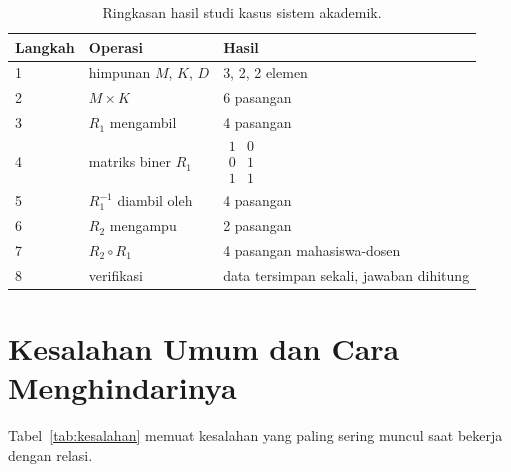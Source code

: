 \documentclass[11pt,a4paper]{article}
\begin{document}
\begin{table}[H]
	\centering
	\caption{Ringkasan hasil studi kasus sistem akademik.}
	\label{tab:studi-kasus}
	\small
	\begin{tabularx}{\textwidth}{l X l}
		\toprule
		Langkah & Operasi                 & Hasil                                               \\
		\midrule
		1       & himpunan $M$, $K$, $D$  & 3, 2, 2 elemen                                      \\
		2       & $M \times K$            & 6 pasangan                                          \\
		3       & $R_1$ mengambil         & 4 pasangan                                          \\
		4       & matriks biner $R_1$     & $\begin{smallmatrix}1&0\\0&1\\1&1\end{smallmatrix}$ \\
		5       & $R_1^{-1}$ diambil oleh & 4 pasangan                                          \\
		6       & $R_2$ mengampu          & 2 pasangan                                          \\
		7       & $R_2 \circ R_1$         & 4 pasangan mahasiswa-dosen                          \\
		8       & verifikasi              & data tersimpan sekali, jawaban dihitung             \\
		\bottomrule
	\end{tabularx}
\end{table}

\section{Kesalahan Umum dan Cara Menghindarinya}

Tabel~\ref{tab:kesalahan} memuat kesalahan yang paling sering muncul saat bekerja dengan relasi.
\end{document}
